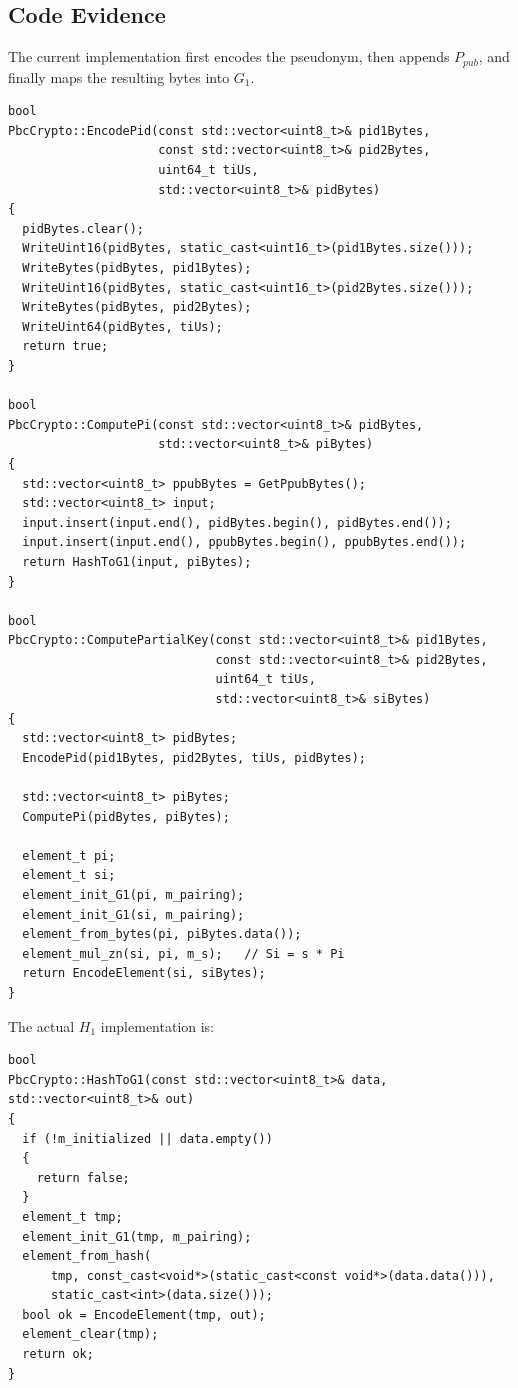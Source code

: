 \documentclass[11pt,a4paper]{article}
\begin{document}
\subsection{Code Evidence}

The current implementation first encodes the pseudonym, then appends
\(P_{pub}\), and finally maps the resulting bytes into \(G_1\).

\begin{lstlisting}[style=cppstyle,caption={PID encoding and partial key generation.}]
bool
PbcCrypto::EncodePid(const std::vector<uint8_t>& pid1Bytes,
                     const std::vector<uint8_t>& pid2Bytes,
                     uint64_t tiUs,
                     std::vector<uint8_t>& pidBytes)
{
  pidBytes.clear();
  WriteUint16(pidBytes, static_cast<uint16_t>(pid1Bytes.size()));
  WriteBytes(pidBytes, pid1Bytes);
  WriteUint16(pidBytes, static_cast<uint16_t>(pid2Bytes.size()));
  WriteBytes(pidBytes, pid2Bytes);
  WriteUint64(pidBytes, tiUs);
  return true;
}

bool
PbcCrypto::ComputePi(const std::vector<uint8_t>& pidBytes,
                     std::vector<uint8_t>& piBytes)
{
  std::vector<uint8_t> ppubBytes = GetPpubBytes();
  std::vector<uint8_t> input;
  input.insert(input.end(), pidBytes.begin(), pidBytes.end());
  input.insert(input.end(), ppubBytes.begin(), ppubBytes.end());
  return HashToG1(input, piBytes);
}

bool
PbcCrypto::ComputePartialKey(const std::vector<uint8_t>& pid1Bytes,
                             const std::vector<uint8_t>& pid2Bytes,
                             uint64_t tiUs,
                             std::vector<uint8_t>& siBytes)
{
  std::vector<uint8_t> pidBytes;
  EncodePid(pid1Bytes, pid2Bytes, tiUs, pidBytes);

  std::vector<uint8_t> piBytes;
  ComputePi(pidBytes, piBytes);

  element_t pi;
  element_t si;
  element_init_G1(pi, m_pairing);
  element_init_G1(si, m_pairing);
  element_from_bytes(pi, piBytes.data());
  element_mul_zn(si, pi, m_s);   // Si = s * Pi
  return EncodeElement(si, siBytes);
}
\end{lstlisting}

The actual \(H_1\) implementation is:

\begin{lstlisting}[style=cppstyle,caption={HashToG1 implementation used for H1.}]
bool
PbcCrypto::HashToG1(const std::vector<uint8_t>& data, std::vector<uint8_t>& out)
{
  if (!m_initialized || data.empty())
  {
    return false;
  }
  element_t tmp;
  element_init_G1(tmp, m_pairing);
  element_from_hash(
      tmp, const_cast<void*>(static_cast<const void*>(data.data())),
      static_cast<int>(data.size()));
  bool ok = EncodeElement(tmp, out);
  element_clear(tmp);
  return ok;
}
\end{lstlisting}
\end{document}

